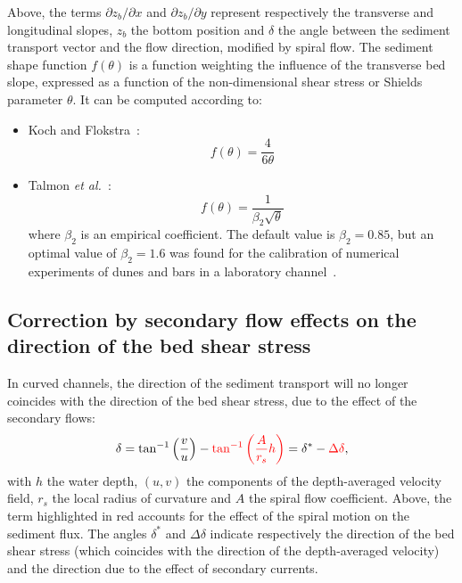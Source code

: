 Above, the terms $\partial z_b/\partial x$ and $\partial z_b/\partial y$ represent respectively the transverse and longitudinal slopes, $z_b$ the bottom position and $\delta$ the angle between the sediment transport vector and the flow direction, modified by spiral flow. The sediment shape function $f(\theta)$ is a function weighting the influence of the transverse bed slope, expressed as a function of the non-dimensional shear stress or Shields parameter $\theta$. It can be computed according to:

\begin{itemize}
\item Koch and Flokstra~\cite{KochFlokstra80}:
\begin{equation*}
f(\theta) = \frac{4}{6\theta}
\end{equation*}
\item Talmon \textit{et al.}~\cite{Talmon95}:
\begin{equation*}
f(\theta) = \frac{1}{\beta_2\sqrt{\theta}}
\end{equation*}
where $\beta_2$ is an empirical coefficient. The default value is $\beta_2=0.85$, but an optimal value of $\beta_2=1.6$ was found for the calibration of numerical experiments of dunes and bars in a laboratory channel~\cite{Mendoza15}.
\end{itemize}

\subsection{Correction by secondary flow effects on the direction of the bed shear stress}
In curved channels, the direction of the sediment transport will no longer coincides with the direction of the bed shear stress,
due to the effect of the secondary flows:
\begin{equation}\label{eq:delta}
\delta = \tan^{-1}\left(\frac{v}{u}\right) - \textcolor{red}{\tan^{-1}\left(\frac{A}{r_s}h\right)} = \delta^* - \textcolor{red}{\Delta\delta},
\end{equation}
with $h$ the water depth, $(u,v)$ the components of the depth-averaged velocity field, $r_s$ the local radius of curvature and $A$ the spiral flow coefficient. Above, the term highlighted in red accounts for the effect of the spiral motion on the sediment flux. The angles $\delta^*$ and $\Delta\delta$ indicate respectively the direction of the bed shear stress (which coincides with the direction of the depth-averaged velocity) and the direction due to the effect of secondary currents.

